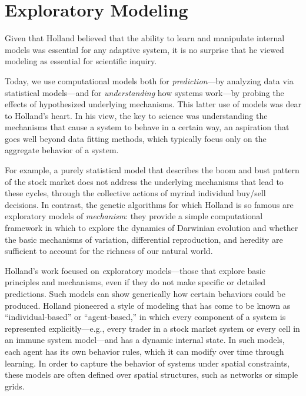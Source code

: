 \documentclass{sig-alternate}
\begin{document}

\section{Exploratory Modeling}

Given that Holland believed that the ability to learn and manipulate
internal models was essential for any adaptive system, it is no
surprise that he viewed modeling as essential for scientific inquiry.


Today, we use computational models both for \emph{prediction}---by
analyzing data via statistical models---and for \emph{understanding}
how systems work---by probing the effects of hypothesized underlying
mechanisms.  This latter use of models was dear to Holland's heart.
In his view, the key to science was understanding the mechanisms that
cause a system to behave in a certain way, an aspiration that goes
well beyond data fitting methods, which typically focus only on
the aggregate behavior of a system.  

For example, a purely statistical model that describes the boom and bust
pattern of the stock market
does not address the underlying mechanisms
that lead to these cycles, through the collective actions of myriad
individual buy/sell decisions.  
In contrast, the genetic algorithms for which Holland is so famous
are exploratory models of \emph{mechanism}: they provide a simple
computational framework in which to explore the dynamics of Darwinian
evolution and whether the basic mechanisms of variation, differential
reproduction, and heredity are sufficient to account for the richness
of our natural world.

Holland's work focused on {\emph exploratory} models---those that explore basic principles and
mechanisms, even if they do not make specific or detailed
predictions.  Such models can show generically how certain behaviors
could be produced.  Holland pioneered a style of modeling that has
come to be known as ``individual-based'' or ``agent-based,'' in which
every component of a system is represented explicitly---e.g., every
trader in a stock market system or every cell in an immune system
model---and has a dynamic internal state. In such models, each agent has
its own behavior rules, which it can modify over time through learning.  In
order to capture the behavior of systems under spatial
constraints, these models are often defined over spatial structures,
such as networks or simple grids.
\end{document}
